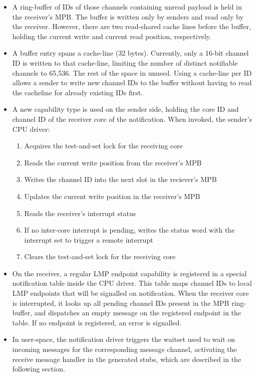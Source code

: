 \documentclass[a4paper,twoside]{report} %
\begin{document}
\begin{itemize}
\item A ring-buffer of IDs of those channels containing unread payload
  is held in the receiver's MPB. The buffer is written only by senders and
  read only by the receiver. However, there are two read-shared
  cache lines before the buffer, holding the current write and current
  read position, respectively.
\item A buffer entry spans a cache-line (32 bytes). Currently, only a
  16-bit channel ID is written to that cache-line, limiting the number
  of distinct notifiable channels to 65,536. The rest of the space in
  unused. Using a cache-line per ID allows a sender to write new
  channel IDs to the buffer without having to read the cacheline for
  already existing IDs first.
\item A new capability type is used on the sender side, holding the
  core ID and channel ID of the receiver core of the
  notification. When invoked, the sender's CPU driver:
  \begin{enumerate}
   \item Acquires the test-and-set lock for the receiving core
   \item Reads the current write position from the receiver's MPB
   \item Writes the channel ID into the next slot in the reciever's MPB
   \item Updates the current write position in the receiver's MPB
   \item Reads the receiver's interrupt status
   \item If no inter-core interrupt is pending, writes the status word
         with the interrupt set to trigger a remote interrupt
   \item Clears the test-and-set lock for the receiving core
  \end{enumerate}
\item On the receiver, a regular LMP endpoint capability is registered
  in a special notification table inside the CPU driver. This table maps
  channel IDs to local LMP endpoints that will be signalled on notification.
  When the receiver core is interrupted, it looks up all pending channel IDs
  present in the MPB ring-buffer, and dispatches an empty message on the
  registered endpoint in the table. If no endpoint is registered, an error
  is signalled.
\item In user-space, the notification driver triggers the waitset used
  to wait on incoming messages for the corresponding message channel,
  activating the receive message handler in the generated stubs, which
  are described in the following section.
\end{itemize}
\end{document}
